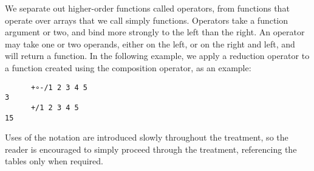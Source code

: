 \documentclass[numbers,preprint]{sigplanconf}
\begin{document}
We separate out higher-order functions called operators, from functions that 
operate over arrays that we call simply functions. Operators take a function 
argument or two, and bind more strongly to the left than the right. An 
operator may take one or two operands, either on the left, or on the 
right and left, and will return a function. In the following 
example, we apply a reduction operator to a function created using the 
composition operator, as an example:

\begin{verbatim}
      +∘-/1 2 3 4 5
3
      +/1 2 3 4 5
15
\end{verbatim}

Uses of the notation are introduced slowly throughout the treatment, so 
the reader is encouraged to simply proceed through the treatment, referencing 
the tables only when required. 
\end{document}
